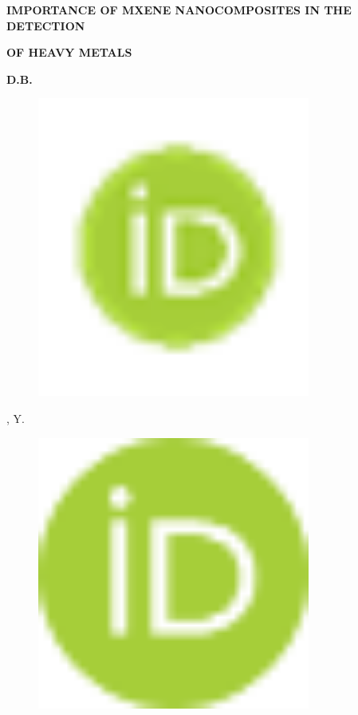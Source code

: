
{\bfseries IMPORTANCE OF MXENE NANOCOMPOSITES IN THE DETECTION}

{\bfseries OF HEAVY METALS}

{\bfseries D.B.
\begin{figure}[H]
	\centering
	\includegraphics[width=0.8\textwidth]{media/chem2/image8}
	\caption*{}
\end{figure}

, Y.
\begin{figure}[H]
	\centering
	\includegraphics[width=0.8\textwidth]{media/chem2/image9}
	\caption*{}
\end{figure}

}
